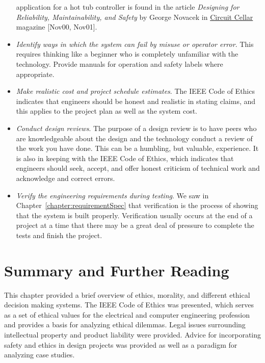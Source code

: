 \begin{itemize}
  application for a hot tub controller is found in the article
  \emph{Designing for Reliability, Maintainability, and Safety} by
  George Novacek in \ul{Circuit Cellar} magazine {[}Nov00, Nov01{]}.
\item
  \emph{Identify ways in which the system can fail by misuse or operator
  error}. This requires thinking like a beginner who is completely
  unfamiliar with the technology. Provide manuals for operation and
  safety labels where appropriate.
\item
  \emph{Make realistic cost and project schedule estimates}. The IEEE
  Code of Ethics indicates that engineers should be honest and realistic
  in stating claims, and this applies to the project plan as well as the
  system cost.
\item
  \emph{Conduct design reviews}. The purpose of a design review is to
  have peers who are knowledgeable about the design and the technology
  conduct a review of the work you have done. This can be a humbling,
  but valuable, experience. It is also in keeping with the IEEE Code of
  Ethics, which indicates that engineers should seek, accept, and offer
  honest criticism of technical work and acknowledge and correct errors.
\item
  \emph{Verify the engineering requirements during testing}. We saw in
  Chapter~\ref{chapter:requirementSpec} that verification is the 
process of showing that the system
  is built properly. Verification usually occurs at the end of a project
  at a time that there may be a great deal of pressure to complete the
  tests and finish the project.
\end{itemize}

\section{Summary and Further Reading}
\label{section:summary-and-further-reading}

This chapter provided a brief overview of ethics, morality, and
different ethical decision making systems. The IEEE Code of Ethics was
presented, which serves as a set of ethical values for the electrical
and computer engineering profession and provides a basis for analyzing
ethical dilemmas. Legal issues surrounding intellectual property and
product liability were provided. Advice for incorporating safety and
ethics in design projects was provided as well as a paradigm for
analyzing case studies.

